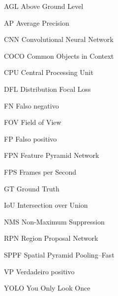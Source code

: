 \begin{siglas}
\item[AGL] Above Ground Level
\item[AP] Average Precision
\item[CNN] Convolutional Neural Network
\item[COCO] Common Objects in Context
\item[CPU] Central Processing Unit
\item[DFL] Distribution Focal Loss
\item[FN] Falso negativo
\item[FOV] Field of View
\item[FP] Falso positivo
\item[FPN] Feature Pyramid Network
\item[FPS] Frames per Second
\item[GT] Ground Truth
\item[IoU] Intersection over Union
\item[NMS] Non-Maximum Suppression
\item[RPN] Region Proposal Network
\item[SPPF] Spatial Pyramid Pooling--Fast
\item[VP] Verdadeiro positivo
\item[YOLO] You Only Look Once
\end{siglas}
